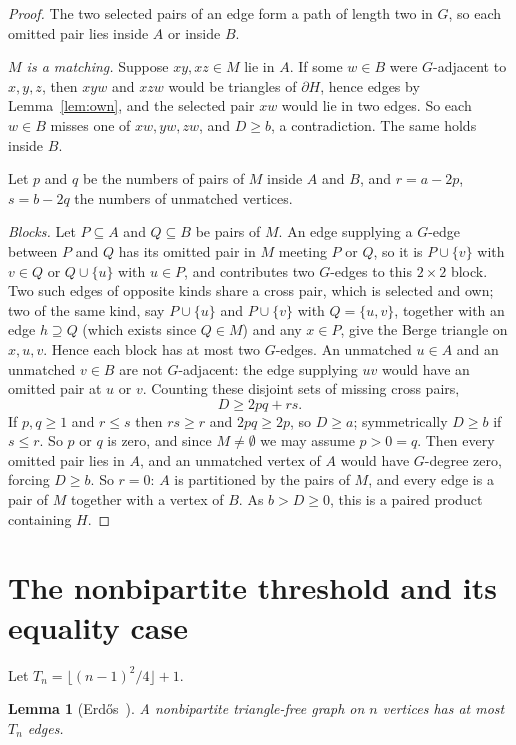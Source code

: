\documentclass[11pt]{article}
\newtheorem{lemma}[theorem]{Lemma}
\theoremstyle{remark}
\newcommand{\sh}{\partial}
\begin{document}
\begin{proof}
The two selected pairs of an edge form a path of length two in $G$, so each
omitted pair lies inside $A$ or inside $B$.

\emph{$M$ is a matching.} Suppose $xy,xz\in M$ lie in $A$. If some $w\in B$
were $G$-adjacent to $x,y,z$, then $xyw$ and $xzw$ would be triangles of
$\sh H$, hence edges by Lemma~\ref{lem:own}, and the selected pair $xw$
would lie in two edges. So each $w\in B$ misses one of $xw,yw,zw$, and
$D\ge b$, a contradiction. The same holds inside $B$.

Let $p$ and $q$ be the numbers of pairs of $M$ inside $A$ and $B$, and
$r=a-2p$, $s=b-2q$ the numbers of unmatched vertices.

\emph{Blocks.} Let $P\subseteq A$ and $Q\subseteq B$ be pairs of $M$. An edge
supplying a $G$-edge between $P$ and $Q$ has its omitted pair in $M$ meeting
$P$ or $Q$, so it is $P\cup\{v\}$ with $v\in Q$ or $Q\cup\{u\}$ with $u\in P$,
and contributes two $G$-edges to this $2\times2$ block. Two such edges of
opposite kinds share a cross pair, which is selected and own; two of the same
kind, say $P\cup\{u\}$ and $P\cup\{v\}$ with $Q=\{u,v\}$, together with an
edge $h\supseteq Q$ (which exists since $Q\in M$) and any $x\in P$, give the
Berge triangle on $x,u,v$. Hence each block has at most two $G$-edges.
An unmatched $u\in A$ and an unmatched $v\in B$ are not $G$-adjacent: the
edge supplying $uv$ would have an omitted pair at $u$ or $v$. Counting
these disjoint sets of missing cross pairs,
\[
D\ge 2pq+rs .
\]
If $p,q\ge1$ and $r\le s$ then $rs\ge r$ and $2pq\ge 2p$, so $D\ge a$;
symmetrically $D\ge b$ if $s\le r$. So $p$ or $q$ is zero, and since
$M\ne\emptyset$ we may assume $p>0=q$. Then every omitted pair lies in $A$,
and an unmatched vertex of $A$ would have $G$-degree zero, forcing $D\ge b$.
So $r=0$: $A$ is partitioned by the pairs of $M$, and every edge is a pair of
$M$ together with a vertex of $B$. As $b>D\ge0$, this is a paired product
containing $H$.
\end{proof}

\section{The nonbipartite threshold and its equality case}

Let $T_n=\lfloor (n-1)^2/4\rfloor+1$.

\begin{lemma}[{Erd\H{o}s~\cite[Lemma~1]{Erdos}}]\label{lem:erdos}
A nonbipartite triangle-free graph on $n$ vertices has at most $T_n$ edges.
\end{lemma}
\end{document}
